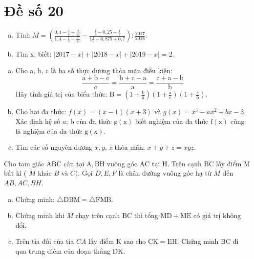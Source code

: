\onehalfspacing
\section{Đề số 20}
\graphicspath{{./img/}}
\begin{bt} 
    \hfil
    \begin{enumerate}[a.]
        \item Tính $M=\left(\frac{0,4-\frac{2}{9}+\frac{2}{11}}{1,4-\frac{7}{9}+\frac{7}{11}}-\frac{\frac{1}{3}-0,25+\frac{1}{5}}{1 \frac{1}{6}-0,875+0,7}\right): \frac{2017}{2018}$.
        \item Tìm x, biết: $|2017-x|+|2018-x|+|2019-x|=2$.
    \end{enumerate}
\loigiai{}
\end{bt}

\begin{bt}
    \hfill
	\begin{enumerate}[a.]
        \item Cho a, b, c là ba số thực dương thỏa mãn điều kiện:
        $$
        \frac{\mathrm{a}+\mathrm{b}-\mathrm{c}}{\mathrm{c}}=\frac{\mathrm{b}+\mathrm{c}-\mathrm{a}}{\mathrm{a}}=\frac{\mathrm{c}+\mathrm{a}-\mathrm{b}}{\mathrm{b}}
        $$
        Hãy tính giá trị của biểu thức: $\mathrm{B}=\left(1+\frac{\mathrm{b}}{\mathrm{a}}\right)\left(1+\frac{\mathrm{a}}{\mathrm{c}}\right)\left(1+\frac{\mathrm{c}}{\mathrm{b}}\right)$.
        \item Cho hai đa thức: $f(x)=(x-1)(x+3)$ và $g(x)=x^3-a x^2+b x-3$
        Xác định hệ số $a$; b của đa thức $\mathrm{g}(\mathrm{x})$ biết nghiệm của đa thức $\mathrm{f}(\mathrm{x})$ cũng là nghiệm của đa thức $\mathrm{g}(\mathrm{x})$.
        \item Tìm các số nguyên dương $x, y$, $z$ thỏa mãn: $x+y+z=x y z$.
    \end{enumerate}
	\loigiai{} 
\end{bt}

\begin{bt}
    Cho tam giác $\mathrm{ABC}$ cân tại $\mathrm{A}, \mathrm{BH}$ vuông góc $\mathrm{AC}$ tại $\mathrm{H}$. Trên cạnh $\mathrm{BC}$ lấy điểm $\mathrm{M}$ bất kì ( $M$ khác $B$ và $C)$. Gọi $D, E, F$ là chân đường vuông góc hạ từ $M$ đến $A B, A C, B H$.
	\begin{enumerate}[a.]
        \item Chứng minh: $\triangle \mathrm{DBM}=\triangle \mathrm{FMB}$.
        \item Chứng minh khi $M$ chạy trên cạnh $\mathrm{BC}$ thì tổng $\mathrm{MD}+\mathrm{ME}$ có giá trị không đổi.
        \item Trên tia đối của tia $CA$ lấy điểm $\mathrm{K}$ sao cho $\mathrm{CK}=\mathrm{EH}$.
        Chứng minh $\mathrm{BC}$ đi qua trung điêm của đoạn thẳng $\mathrm{DK}$.
    \end{enumerate}
	\loigiai{}
\end{bt}

